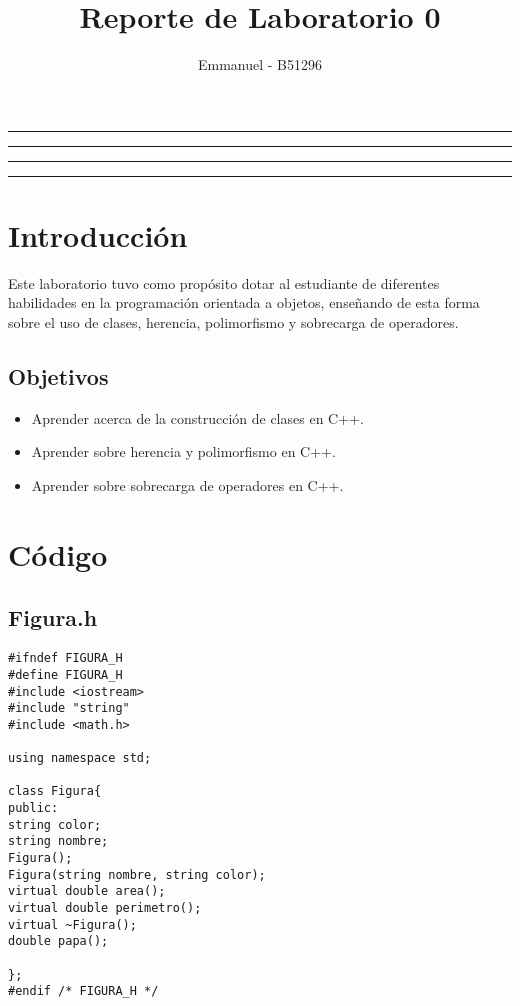 \documentclass[11pt]{article}
\title{Reporte de Laboratorio 0}
\author{Emmanuel - B51296}
\begin{document}
\maketitle
\hrule
\hrule
\tableofcontents
\hspace{5mm}
\hrule
\hrule


\section{Introducción}
Este laboratorio tuvo como propósito dotar al estudiante de diferentes habilidades en la programación orientada a objetos, enseñando de esta forma sobre el uso de clases, herencia, polimorfismo y sobrecarga de operadores.
\subsection{Objetivos}
\begin{itemize}
	\item Aprender acerca de la construcción de clases en C++.
	\item Aprender sobre herencia y polimorfismo en C++.
	\item Aprender sobre sobrecarga de operadores en C++.
\end{itemize}

\section{Código}

\subsection{Figura.h}
\begin{lstlisting}
#ifndef FIGURA_H
#define FIGURA_H
#include <iostream>
#include "string"
#include <math.h> 

using namespace std;

class Figura{
public:
string color;
string nombre;
Figura();
Figura(string nombre, string color);
virtual double area();
virtual double perimetro();
virtual ~Figura();
double papa();

};
#endif /* FIGURA_H */

\end{lstlisting}
\end{document}
